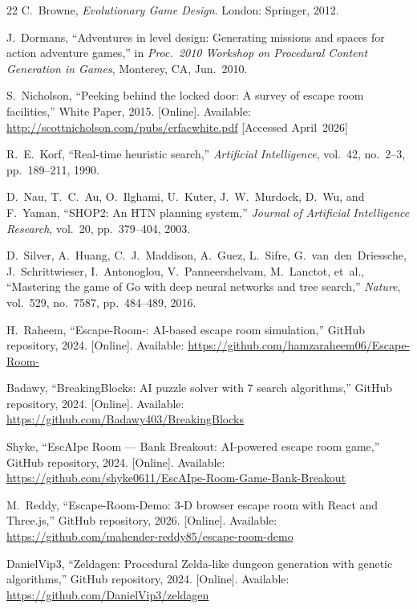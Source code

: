 \documentclass[12pt, a4paper]{report}
\begin{document}
\begin{thebibliography}{22}
C.~Browne,
\textit{Evolutionary Game Design}.
London: Springer, 2012.

J.~Dormans,
``Adventures in level design: Generating missions and spaces for action
adventure games,''
in \textit{Proc.\ 2010 Workshop on Procedural Content Generation in Games},
Monterey, CA, Jun.~2010.

S.~Nicholson,
``Peeking behind the locked door: A survey of escape room facilities,''
White Paper, 2015.
[Online]. Available:
\url{http://scottnicholson.com/pubs/erfacwhite.pdf} [Accessed April~2026]

R.~E.~Korf,
``Real-time heuristic search,''
\textit{Artificial Intelligence}, vol.~42, no.~2--3, pp.~189--211, 1990.

D.~Nau, T.~C.~Au, O.~Ilghami, U.~Kuter, J.~W.~Murdock, D.~Wu, and F.~Yaman,
``SHOP2: An HTN planning system,''
\textit{Journal of Artificial Intelligence Research}, vol.~20, pp.~379--404,
2003.

D.~Silver, A.~Huang, C.~J.~Maddison, A.~Guez, L.~Sifre, G.~van~den~Driessche,
J.~Schrittwieser, I.~Antonoglou, V.~Panneershelvam, M.~Lanctot, et~al.,
``Mastering the game of Go with deep neural networks and tree search,''
\textit{Nature}, vol.~529, no.~7587, pp.~484--489, 2016.

H.~Raheem, ``Escape-Room-: AI-based escape room simulation,''
GitHub repository, 2024. [Online]. Available:
\url{https://github.com/hamzaraheem06/Escape-Room-}

Badawy, ``BreakingBlocks: AI puzzle solver with 7 search algorithms,''
GitHub repository, 2024. [Online]. Available:
\url{https://github.com/Badawy403/BreakingBlocks}

Shyke, ``EscAIpe Room --- Bank Breakout: AI-powered escape room game,''
GitHub repository, 2024. [Online]. Available:
\url{https://github.com/shyke0611/EscAIpe-Room-Game-Bank-Breakout}

M.~Reddy, ``Escape-Room-Demo: 3-D browser escape room with React and Three.js,''
GitHub repository, 2026. [Online]. Available:
\url{https://github.com/mahender-reddy85/escape-room-demo}

DanielVip3, ``Zeldagen: Procedural Zelda-like dungeon generation with genetic algorithms,''
GitHub repository, 2024. [Online]. Available:
\url{https://github.com/DanielVip3/zeldagen}

\end{thebibliography}
\end{document}
